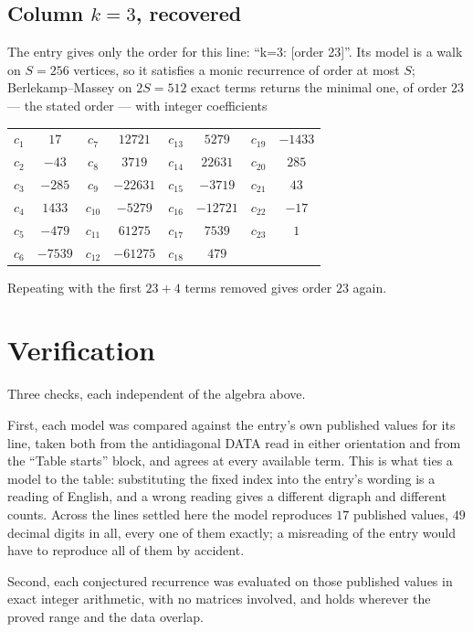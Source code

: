 \documentclass[11pt,a4paper]{article}
\theoremstyle{plain}
\theoremstyle{definition}
\begin{document}
\subsection*{Column $k=3$, recovered}
The entry gives only the order for this line: ``k=3: [order 23]''. Its model is a walk on
$S=256$ vertices, so it satisfies a monic recurrence of order at most $S$;
Berlekamp--Massey on $2S=512$ exact terms returns the minimal one, of order
$23$ --- the stated order --- with integer coefficients
\begin{center}\small\begin{tabular}{cccccccc}
$c_{1}$ & $17$ & $c_{7}$ & $12721$ & $c_{13}$ & $5279$ & $c_{19}$ & $-1433$ \\
$c_{2}$ & $-43$ & $c_{8}$ & $3719$ & $c_{14}$ & $22631$ & $c_{20}$ & $285$ \\
$c_{3}$ & $-285$ & $c_{9}$ & $-22631$ & $c_{15}$ & $-3719$ & $c_{21}$ & $43$ \\
$c_{4}$ & $1433$ & $c_{10}$ & $-5279$ & $c_{16}$ & $-12721$ & $c_{22}$ & $-17$ \\
$c_{5}$ & $-479$ & $c_{11}$ & $61275$ & $c_{17}$ & $7539$ & $c_{23}$ & $1$ \\
$c_{6}$ & $-7539$ & $c_{12}$ & $-61275$ & $c_{18}$ & $479$ &  &  \\
\end{tabular}\end{center}
Repeating with the first $23+4$ terms removed gives order $23$ again.

\section{Verification}

Three checks, each independent of the algebra above.

First, each model was compared against the entry's own published values for its line, taken
both from the antidiagonal DATA read in either orientation and from the ``Table starts''
block, and agrees at every available term. This is what ties a model to the table:
substituting the fixed index into the entry's wording is a reading of English, and a wrong
reading gives a different digraph and different counts. Across the lines settled here the
model reproduces $17$ published values, $49$ decimal digits in all, every one of
them exactly; a misreading of the entry would have to reproduce all of them by accident.

Second, each conjectured recurrence was evaluated on those published values in exact
integer arithmetic, with no matrices involved, and holds wherever the proved range and the
data overlap.
\end{document}
